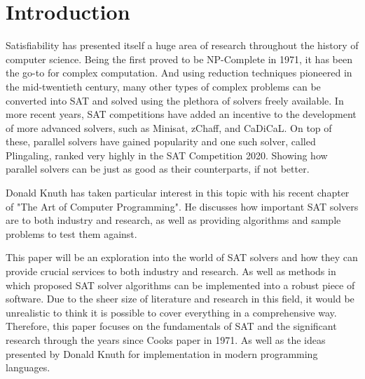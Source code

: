 \documentclass{article}
\begin{document}


\newpage
\thispagestyle{empty}
\tableofcontents

\newpage
\section{Introduction}
Satisfiability has presented itself a huge area of research throughout the history of computer
science. Being the first proved to be NP-Complete in 1971\cite{scook}, it has been the go-to for complex
computation. And using reduction techniques pioneered in the mid-twentieth century, many other types
of complex problems can be converted into SAT and solved using the plethora of solvers freely
available. In more recent years, SAT competitions have added an incentive to the development of more
advanced solvers, such as Minisat, zChaff, and CaDiCaL. On top of these, parallel solvers have
gained popularity and one such solver, called Plingaling, ranked very highly in the SAT Competition
2020. Showing how parallel solvers can be just as good as their counterparts, if not better.

Donald Knuth has taken particular interest in this topic with his recent chapter of "The Art of Computer Programming". He discusses how important SAT solvers are to both industry and research, as well as providing algorithms and sample problems to test them against.

This paper will be an exploration into the world of SAT solvers and how they can provide crucial services to both industry and research. As well as methods in which proposed SAT solver algorithms can be implemented into a robust piece of software. Due to the sheer size of literature and research in this field, it would be unrealistic to think it is possible to cover everything in a comprehensive way. Therefore, this paper focuses on the fundamentals of SAT and the significant research through the years since Cooks paper in 1971\cite{scook}. As well as the ideas presented by Donald Knuth for implementation in modern programming languages.
\end{document}
